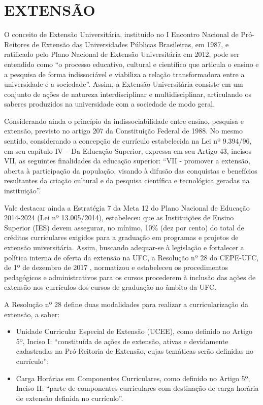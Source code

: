 \chapter{EXTENSÃO}
\label{cap:extensao}

O conceito de Extensão Universitária, instituído no I Encontro Nacional de Pró-Reitores de Extensão das Universidades Públicas Brasileiras, em 1987, e ratificado pelo Plano Nacional de Extensão Universitária em 2012, pode ser entendido como ``o processo educativo, cultural e científico que articula o ensino e a pesquisa de forma indissociável e viabiliza a relação transformadora entre a universidade e a sociedade''. Assim, a Extensão Universitária consiste em um conjunto de ações de natureza interdisciplinar e multidisciplinar, articulando os saberes produzidos na universidade com a sociedade de modo geral.

Considerando ainda o princípio da indissociabilidade entre ensino, pesquisa e extensão, previsto no artigo 207 da Constituição Federal de 1988. No mesmo sentido, considerando a concepção de currículo estabelecida na Lei nº 9.394/96, em seu capítulo IV – Da Educação Superior, expressa em seu Artigo 43, incisos VII, as seguintes finalidades da educação superior: ``VII - promover a extensão, aberta à participação da população, visando à difusão das conquistas e benefícios resultantes da criação cultural e da pesquisa científica e tecnológica geradas na instituição''.

Vale destacar ainda a Estratégia 7 da Meta 12 do Plano Nacional de Educação 2014-2024 (Lei nº 13.005/2014), estabeleceu que as Instituições de Ensino Superior (IES) devem assegurar, no mínimo, 10\% (dez por cento) do total de créditos curriculares exigidos para a graduação em programas e projetos de extensão universitária. Assim, buscando adequar-se à legislação e fortalecer a política interna de oferta da extensão na UFC, a Resolução nº 28 do CEPE-UFC, de 1º de dezembro de 2017 \cite{ufc2017resolucao28}, normatizou e estabeleceu os procedimentos pedagógicos e administrativos para os cursos procederem à inclusão das ações de extensão nos currículos dos cursos de graduação no âmbito da UFC.

A Resolução nº 28 define duas modalidades para realizar a curricularização da extensão, a saber:
\begin{itemize}
    \item Unidade Curricular Especial de Extensão (UCEE), como definido no Artigo 5º, Inciso I: ``constituída de ações de extensão, ativas e devidamente cadastradas na Pró-Reitoria de Extensão, cujas temáticas serão definidas no currículo'';
    \item Carga Horárias em Componentes Curriculares, como definido no Artigo 5º, Inciso II: ``parte de componentes curriculares com destinação de carga horária de extensão definida no currículo''.
\end{itemize}

